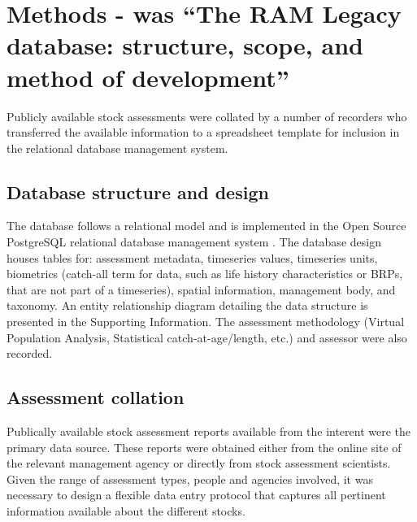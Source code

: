 \documentclass[letterpaper,12pt]{article}
\begin{document}
\newpage
\section{Methods - was ``The RAM Legacy database: structure, scope, and method of development''}

Publicly available stock assessments were collated by a number of
recorders who transferred the available information to a
spreadsheet template for inclusion in the relational database
management system.

\subsection{Database structure and design}
The database follows a relational model and is implemented in the Open
Source PostgreSQL relational database management system
\citep{postgresql:2009}. The database design houses tables for:
assessment metadata, timeseries values, timeseries units, biometrics
(catch-all term for data, such as life history characteristics or
BRPs, that are not part of a timeseries), spatial information,
management body, and taxonomy. An entity relationship diagram
detailing the data structure is presented in the Supporting
Information. The assessment methodology (Virtual Population Analysis,
Statistical catch-at-age/length, etc.) and assessor were also
recorded.

\subsection{Assessment collation}
Publically available stock assessment reports available from the
interent were the primary data source. These reports were obtained
either from the online site of the relevant management agency or
directly from stock assessment scientists. Given the range of
assessment types, people and agencies involved, it was necessary to
design a flexible data entry protocol that captures all pertinent
information available about the different stocks.
\end{document}

